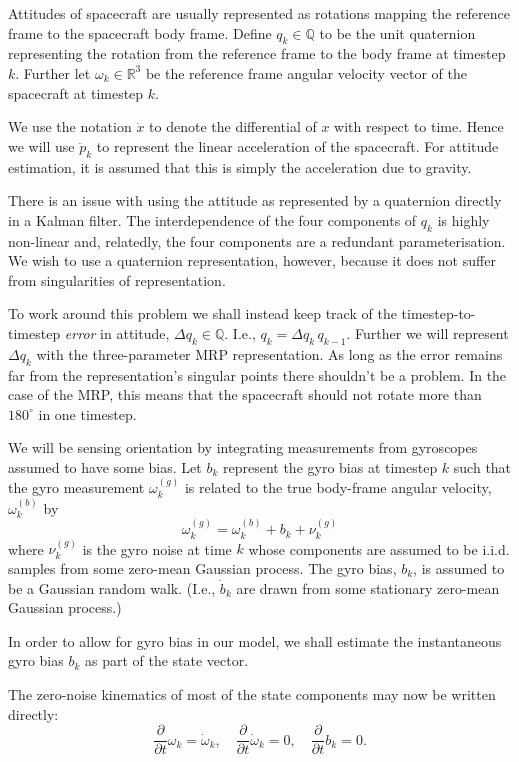 \documentclass[a4paper]{paper}
\begin{document}
Attitudes of spacecraft are usually represented as rotations mapping the
reference frame to the spacecraft body frame. Define $q_k \in \mathbb{Q}$ to be
the unit quaternion representing the rotation from the reference frame to the
body frame at timestep $k$. Further let $\omega_k \in \mathbb{R}^3$ be the
reference frame angular velocity vector of the spacecraft at timestep $k$.

We use the notation $\dot{x}$ to denote the differential of $x$ with respect to
time. Hence we will use $\ddot{p}_k$ to represent the linear acceleration of the
spacecraft. For attitude estimation, it is assumed that this is simply the
acceleration due to gravity.

There is an issue with using the attitude as represented by a quaternion
directly in a Kalman filter. The interdependence of the four components of $q_k$
is highly non-linear and, relatedly, the four components are a redundant
parameterisation. We wish to use a quaternion representation, however, because
it does not suffer from singularities of representation.

To work around this problem we shall instead keep track of the
timestep-to-timestep \emph{error} in attitude, $\Delta q_k \in \mathbb{Q}$.
I.e., $q_k = \Delta q_k \, q_{k-1}$. Further we will represent $\Delta
q_k$ with the three-parameter MRP representation. As long as the error
remains far from the representation's singular points there shouldn't be a
problem. In the case of the MRP, this means that the spacecraft should not
rotate more than $180^\circ$ in one timestep.

We will be sensing orientation by integrating measurements from gyroscopes
assumed to have some bias. Let $b_k$
represent the gyro bias at timestep $k$ such that the gyro measurement
$\omega^{(g)}_k$ is related to the true body-frame angular velocity,
$\omega^{(b)}_k$ by
$$
\omega^{(g)}_k = \omega^{(b)}_k + b_k + \nu^{(g)}_k
$$
where $\nu^{(g)}_k$ is the gyro noise at time $k$ whose components are assumed
to be i.i.d. samples from some zero-mean Gaussian process. The gyro bias, $b_k$,
is assumed to be a Gaussian random walk. (I.e., $\dot{b}_k$ are drawn from some
stationary zero-mean Gaussian process.)

In order to allow for gyro bias in our model, we shall estimate the
instantaneous gyro bias $b_k$ as part of the state vector.

The zero-noise kinematics of most of the state components may now be written
directly:
$$
\frac{\partial}{\partial t} \omega_k = \dot{\omega}_k, \quad
\frac{\partial}{\partial t} \dot{\omega}_k = 0, \quad
\frac{\partial}{\partial t} b_k = 0.
$$
\end{document}
